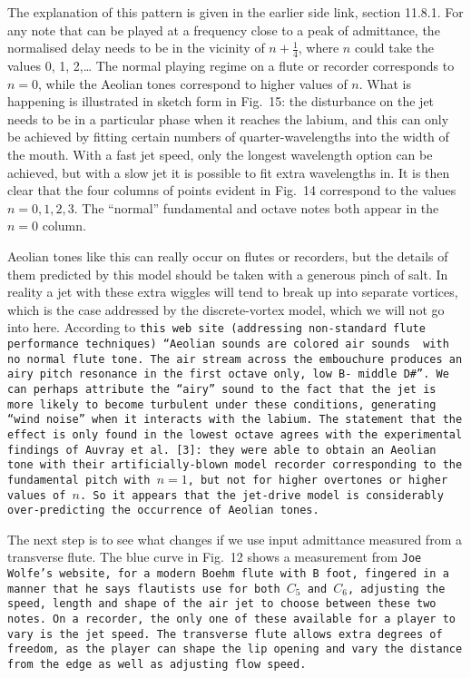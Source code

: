   The explanation of this pattern is given in the earlier side link, section 
  11.8.1. For any note that can be played at a frequency close to a peak of 
  admittance, the normalised delay needs to be in the vicinity of 
  $n+\frac{1}{4}$, where $n$ could take the values 0, 1, 2,… The normal playing 
  regime on a flute or recorder corresponds to $n=0$, while the Aeolian tones 
  correspond to higher values of $n$. What is happening is illustrated in 
  sketch form in Fig.\ 15: the disturbance on the jet needs to be in a 
  particular phase when it reaches the labium, and this can only be achieved by 
  fitting certain numbers of quarter-wavelengths into the width of the mouth. 
  With a fast jet speed, only the longest wavelength option can be achieved, 
  but with a slow jet it is possible to fit extra wavelengths in. It is then 
  clear that the four columns of points evident in Fig.\ 14 correspond to the 
  values $n=0,1,2,3$. The ``normal'' fundamental and octave notes both appear 
  in the $n=0$ column. 

  Aeolian tones like this can really occur on flutes or recorders, but the 
  details of them predicted by this model should be taken with a generous pinch 
  of salt. In reality a jet with these extra wiggles will tend to break up into 
  separate vortices, which is the case addressed by the discrete-vortex model, 
  which we will not go into here. According to \tt{}this web site\rm{} 
  (addressing non-standard flute performance techniques) “Aeolian sounds are 
  colored air sounds ~with no normal flute tone. The~air stream across the 
  embouchure produces an airy pitch resonance in the~first octave~only, low B- 
  middle D\#”. We can perhaps attribute the ``airy'' sound to the fact that the 
  jet is more likely to become turbulent under these conditions, generating 
  ``wind noise'' when it interacts with the labium. The statement that the 
  effect is only found in the lowest octave agrees with the experimental 
  findings of Auvray et al. [3]: they were able to obtain an Aeolian tone with 
  their artificially-blown model recorder corresponding to the fundamental 
  pitch with $n=1$, but not for higher overtones or higher values of $n$. So it 
  appears that the jet-drive model is considerably over-predicting the 
  occurrence of Aeolian tones. 

  The next step is to see what changes if we use input admittance measured from 
  a transverse flute. The blue curve in Fig.\ 12 shows a measurement from 
  \tt{}Joe Wolfe’s website\rm{}, for a modern Boehm flute with B foot, fingered 
  in a manner that he says flautists use for both $C_5$ and $C_6$, adjusting 
  the speed, length and shape of the air jet to choose between these two notes. 
  On a recorder, the only one of these available for a player to vary is the 
  jet speed. The transverse flute allows extra degrees of freedom, as the 
  player can shape the lip opening and vary the distance from the edge as well 
  as adjusting flow speed. 

